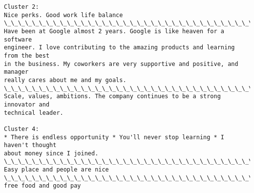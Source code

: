 \documentclass[11pt]{article}
\begin{document}
    \begin{Verbatim}[commandchars=\\\{\}]
Cluster 2:
Nice perks. Good work life balance
\_\_\_\_\_\_\_\_\_\_\_\_\_\_\_\_\_\_\_\_\_\_\_\_\_\_\_\_\_\_\_\_\_\_\_\_\_\_\_\_\_\_\_\_\_\_\_\_\_\_\_\_\_\_\_\_\_\_\_\_\_\_\_\_\_\_\_\_\_\_
Have been at Google almost 2 years. Google is like heaven for a software
engineer. I love contributing to the amazing products and learning from the best
in the business. My coworkers are very supportive and positive, and manager
really cares about me and my goals.
\_\_\_\_\_\_\_\_\_\_\_\_\_\_\_\_\_\_\_\_\_\_\_\_\_\_\_\_\_\_\_\_\_\_\_\_\_\_\_\_\_\_\_\_\_\_\_\_\_\_\_\_\_\_\_\_\_\_\_\_\_\_\_\_\_\_\_\_\_\_
Scale, values, ambitions. The company continues to be a strong innovator and
technical leader.

Cluster 4:
* There is endless opportunity * You'll never stop learning * I haven't thought
about money since I joined.
\_\_\_\_\_\_\_\_\_\_\_\_\_\_\_\_\_\_\_\_\_\_\_\_\_\_\_\_\_\_\_\_\_\_\_\_\_\_\_\_\_\_\_\_\_\_\_\_\_\_\_\_\_\_\_\_\_\_\_\_\_\_\_\_\_\_\_\_\_\_
Easy place and people are nice
\_\_\_\_\_\_\_\_\_\_\_\_\_\_\_\_\_\_\_\_\_\_\_\_\_\_\_\_\_\_\_\_\_\_\_\_\_\_\_\_\_\_\_\_\_\_\_\_\_\_\_\_\_\_\_\_\_\_\_\_\_\_\_\_\_\_\_\_\_\_
free food and good pay


\end{Verbatim}
\end{document}
